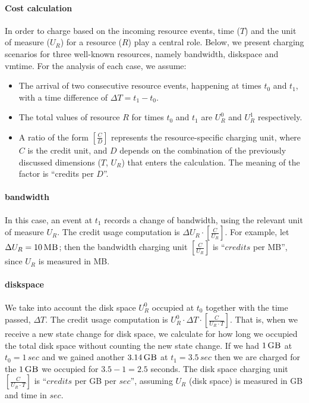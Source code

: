 \documentclass[letterpaper,twocolumn,10pt]{article}
\newcommand{\DTime}{\ensuremath{T}\xspace} %
\newcommand{\DUnitR}{\ensuremath{U_{R}}\xspace} %
\newcommand{\MB}[1]{\ensuremath{#1\,\mbox{\sc MB}}}
\newcommand{\GB}[1]{\ensuremath{#1\,\mbox{\sc GB}}}
\newcommand{\secs}[1]{\ensuremath{#1\,sec}}
\begin{document}

\paragraph{Cost calculation}In order to charge based on the incoming
resource events, time (\DTime) and the unit of measure (\DUnitR) for a
resource ($R$) play a central role. Below, we present charging
scenarios for three well-known resources, namely \textsf{bandwidth},
\textsf{diskspace} and \textsf{vmtime}. For the analysis of each case,
we assume:

\begin{itemize}
\item The arrival of two consecutive resource events, happening at
  times $t_0$ and $t_1$, with a time difference of
  $\Delta T = t_1 - t_0$.

\item The total values of resource $R$ for times $t_0$ and $t_1$ are
  $U_R^0$ and $U_R^1$ respectively.

\item A ratio of the form $[\frac{C}{D}]$ represents the
  resource-specific charging unit, where $C$ is the credit unit, and
  $D$ depends on the combination of the previously discussed
  dimensions ($T$, $U_R$) that enters the calculation. The meaning of
  the factor is ``credits per $D$''.
\end{itemize}

\paragraph{\textsf{bandwidth}}
In this case, an event at $t_1$ records a change of bandwidth, using
the relevant unit of measure $U_R$. The credit usage computation is
$\Delta U_R \cdot [ \frac{C}{U_R} ]$. For example, let $\Delta U_R =
\MB{10}$; then the bandwidth charging unit $[ \frac{C}{U_R} ]$ is
``$credits$ per {\sc MB}'', since $U_R$ is measured in {\sc MB}.

\paragraph{\textsf{diskspace}}
We take into account the disk space $U_R^0$ occupied at $t_0$ together
with the time passed, $\Delta T$. The credit usage computation is
$U_R^{0} \cdot \Delta T \cdot [ \frac{C}{U_R \cdot T} ]$. That is,
when we receive a new state change for disk space, we calculate for
how long we occupied the total disk space without counting the new
state change. If we had \GB{1} at $t_0 = \secs{1}$ and we gained
another \GB{3.14} at $t_1 = \secs{3.5}$ then we are charged for the
\GB{1} we occupied for $3.5 - 1 = 2.5$ seconds. The disk space
charging unit $[ \frac{C}{U_R \cdot T} ]$ is ``$credits$ per {\sc GB}
per $sec$'', assuming $U_R$ (disk space) is measured in {\sc GB} and
time in $sec$.
\end{document}
